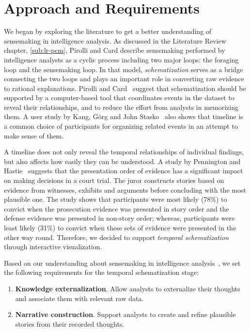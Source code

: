 \section{Approach and Requirements}
We began by exploring the literature to get a better understanding of sensemaking in intelligence analysis. As discussed in the Literature Review chapter, \autoref{sub:lr-pcm}, Pirolli and Card describe sensemaking performed by intelligence analysts as a cyclic process including two major loops: the foraging loop and the sensemaking loop. In that model, \emph{schematization} serves as a bridge connecting the two loops and plays an important role in converting raw evidence to rational explanations. Pirolli and Card~\cite{Pirolli2005} suggest that schematization should be supported by a computer-based tool that coordinates events in the dataset to reveal their relationships, and to reduce the effort from analysts in memorizing them. A user study by Kang, Görg and John Stasko~\cite{Kang2011} also shows that timeline is a common choice of participants for organizing related events in an attempt to make sense of them.

A timeline does not only reveal the temporal relationships of individual findings, but also affects how easily they can be understood. A study by Pennington and Hastie~\cite{Pennington1991} suggests that the presentation order of evidence has a significant impact on making decisions in a court trial. The juror constructs stories based on evidence from witnesses, exhibits and arguments before concluding with the most plausible one. The study shows that participants were most likely (78\%) to convict when the prosecution evidence was presented in story order and the defense evidence was presented in non-story order; whereas, participants were least likely (31\%) to convict when these sets of evidence were presented in the other way round. Therefore, we decided to support \emph{temporal schematization} through interactive visualization.

Based on our understanding about sensemaking in intelligence analysis~\cite{Heuer1999,Pirolli2005}, we set the following requirements for the temporal schematization stage:

\begin{enumerate}
	\item \textbf{Knowledge externalization}. Allow analysts to externalize their thoughts and associate them with relevant raw data.
	\item \textbf{Narrative construction}. Support analysts to create and refine plausible stories from their recorded thoughts.
\end{enumerate}

